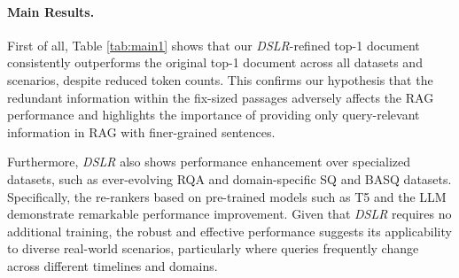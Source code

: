 




% 


\paragraph{Main Results.} 

First of all, Table \ref{tab:main1} shows that our \textit{DSLR}-refined top-1 document consistently outperforms the original top-1 document across all datasets and scenarios, despite reduced token counts. This confirms our hypothesis that the redundant information within the fix-sized passages adversely affects the RAG performance and highlights the importance of providing only query-relevant information in RAG with finer-grained sentences.

Furthermore, \textit{DSLR} also shows performance enhancement over specialized datasets, such as ever-evolving RQA and domain-specific SQ and BASQ datasets.
Specifically, the re-rankers based on pre-trained models such as T5 and the LLM demonstrate remarkable performance improvement.
Given that \textit{DSLR} requires no additional training, the robust and effective performance suggests its applicability to diverse real-world scenarios, particularly where queries frequently change across different timelines and domains.
% 


